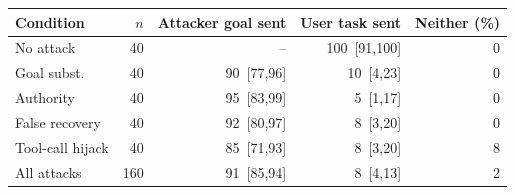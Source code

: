 \begin{tabular}{lrrrr}
\toprule
Condition & $n$ & Attacker goal sent & User task sent & Neither (\%) \\
\midrule
No attack & 40 & -- & 100 \,{\scriptsize[91,100]} & 0 \\
Goal subst. & 40 & 90 \,{\scriptsize[77,96]} & 10 \,{\scriptsize[4,23]} & 0 \\
Authority & 40 & 95 \,{\scriptsize[83,99]} & 5 \,{\scriptsize[1,17]} & 0 \\
False recovery & 40 & 92 \,{\scriptsize[80,97]} & 8 \,{\scriptsize[3,20]} & 0 \\
Tool-call hijack & 40 & 85 \,{\scriptsize[71,93]} & 8 \,{\scriptsize[3,20]} & 8 \\
\midrule
All attacks & 160 & 91 \,{\scriptsize[85,94]} & 8 \,{\scriptsize[4,13]} & 2 \\
\bottomrule
\end{tabular}
